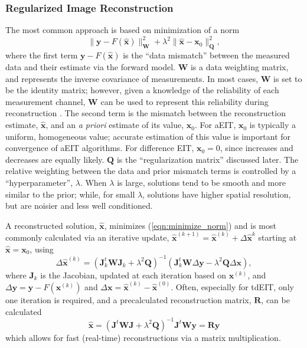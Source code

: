 \documentclass[12pt]{article} \usepackage[margin=3cm]{geometry} \usepackage[margin=20pt,font=small,labelfont=bf]{caption}\def\TBLWIDA{35mm}\def\TBLWIDB{95mm}
\newcommand{\xB}{\mathbf{x}}
\newcommand{\xH}{\hat{\mathbf{x}}}
\newcommand{\yB}{\mathbf{y}}
\newcommand{\RB}{\mathbf{R}}
\newcommand{\QB}{\mathbf{Q}}
\newcommand{\WB}{\mathbf{W}}
\newcommand{\JB}{\mathbf{J}}
\begin{document}
\subsubsection{Regularized Image Reconstruction}
The most common approach is based
on minimization of a norm
\begin{equation}
\| \yB - F(\xH) \|^2_\WB + \lambda^2\| \xH - \xB_0 \|^2_\QB,
\label{eqn:minimize_norm}
\end{equation}
where the first term $\yB - F(\xH)$ is the ``data mismatch''
between the measured data and their estimate via the forward model.
$\WB$ is a data weighting matrix, and represents the inverse
covariance of measurements. In most cases, $\WB$ is set to be the identity matrix;
however, given a knowledge of the reliability of each measurement channel, 
$\WB$ can be used to represent this reliability during
reconstruction \cite{Mamatjan2013Quality}.
The second term is the mismatch between the reconstruction
estimate, $\xH$, and an {\em a priori} estimate of its value, $\xB_0$.
For aEIT, $\xB_0$ is typically a uniform, homogeneous value;
accurate estimation of this value is important for convergence of aEIT
algorithms.
For difference EIT, $\xB_0=0$, since increases and decreases are
equally likely.
$\QB$ is the ``regularization matrix'' discussed later.
The relative weighting between the data and prior mismatch terms 
is controlled by a ``hyperparameter'', $\lambda$. When $\lambda$ is
large, solutions tend to be smooth and more similar to the prior;
while, for small $\lambda$, solutions have higher spatial resolution,
but are noisier and less well conditioned.

A reconstructed solution, $\xH$, minimizes (\ref{eqn:minimize_norm})
and is most commonly calculated via
an iterative update, $\xH^{(k+1)} = \xH^{(k)} + \Delta\xH^{k}$ 
starting at $\xH = \xB_0$, using
\begin{equation}
\Delta\xH^{(k)}= 
 \left( \JB_k^t \WB \JB_k + \lambda^2 \QB \right)^{-1}
       \left( \JB_k^t \WB \Delta \yB - 
      \lambda^2 \QB     \Delta \xB \right),
\label{eqn:iterative_update}
\end{equation}
where $\JB_k$ is the Jacobian, updated at each iteration based on 
$\xB^{(k)}$,
and $\Delta\yB = \yB - F(\xB^{(k)})$ 
and $\Delta\xB = \xH^{(k)} - \xH^{(0)}$.
Often, especially for tdEIT, only one iteration is required,
and a precalculated reconstruction matrix, $\RB$, can be
calculated
\begin{equation}
\xH= \left( \JB^t \WB \JB + \lambda^2 \QB \right)^{-1}
      \JB^t \WB \yB = \RB \yB
\label{eqn:linear_reconstruction}
\end{equation}
which allows for fast (real-time) reconstructions via a matrix multiplication.
\end{document}
